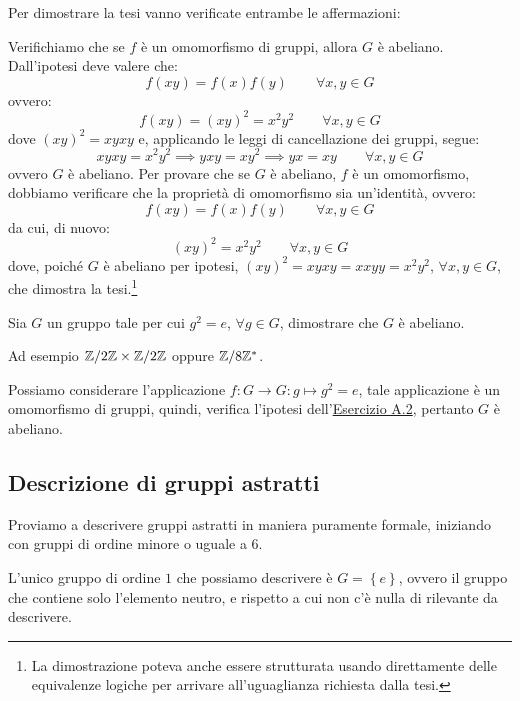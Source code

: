 \documentclass[11pt]{scrartcl}
\begin{document}
\begin{soln}
Per dimostrare la tesi vanno verificate entrambe le affermazioni:
	\begin{itemize}
	\ii Verifichiamo che se $f$ è un omomorfismo di gruppi, allora $G$ è abeliano. Dall'ipotesi deve valere che:
		\[ f(xy)=f(x)f(y)
		\qquad
		\forall x,y \in G
		\]
ovvero:
		\[f(xy)=(xy)^2=x^2y^2 
		\qquad
		\forall x,y \in G
		\]
dove $(xy)^2=xyxy$ e, applicando le leggi di cancellazione dei gruppi, segue:
		\[ xy xy=x^2y^2 \implies yxy = xy^2 \implies yx = xy
		\qquad
		\forall x,y \in G
		\]
ovvero $G$ è abeliano.
	\ii Per provare che se $G$ è abeliano, $f$ è un omomorfismo, dobbiamo verificare che la proprietà di omomorfismo sia un'identità, ovvero:
		\[ f(xy)=f(x)f(y)
		\qquad
		\forall x,y \in G
		\]
da cui, di nuovo:
		\[ (xy)^2=x^2y^2
		\qquad
		\forall x,y \in G
		\]
dove, poiché $G$ è abeliano per ipotesi, $(xy)^2=xyxy=xxyy=x^2y^2$, $\forall x,y \in G$, che dimostra la tesi.\footnote{La dimostrazione poteva anche essere strutturata usando direttamente delle equivalenze logiche per arrivare all'uguaglianza richiesta dalla tesi.} 
	\end{itemize}
\end{soln}

\begin{exercise}
\label{A.3}
Sia $G$ un gruppo tale per cui $g^2 = e$, $\forall g \in G$, dimostrare che $G$ è abeliano.
\end{exercise}

Ad esempio $\mathbb Z/2\mathbb Z \times \mathbb Z/2\mathbb Z$ oppure $\mathbb Z/8\mathbb Z^*$.

\begin{soln}
Possiamo considerare l'applicazione $f: G \longrightarrow G: g \longmapsto g^2=e$, tale applicazione è un omomorfismo di gruppi, quindi, verifica l'ipotesi dell'\hyperref[A:2]{Esercizio A.2}, pertanto $G$ è abeliano.
\end{soln}

\subsection{Descrizione di gruppi astratti}
Proviamo a descrivere gruppi astratti in maniera puramente formale, iniziando con gruppi di ordine minore o uguale a $6$.

\begin{remark}
L'unico gruppo di ordine $1$ che possiamo descrivere è $G = \left\{e\right\}$, ovvero il gruppo che contiene solo l'elemento neutro, e rispetto a cui non c'è nulla di rilevante da descrivere.
\end{remark}
\end{document}
